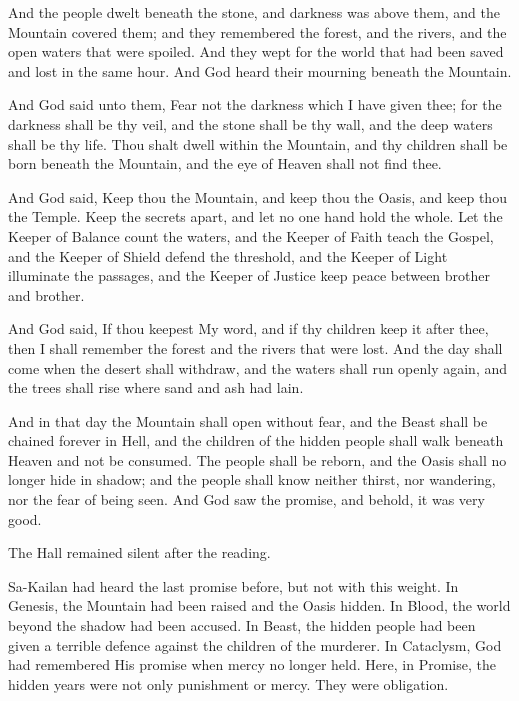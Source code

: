 \begin{scripture}
And the people dwelt beneath the stone, and darkness was above them, and the Mountain covered them; and they remembered the forest, and the rivers, and the open waters that were spoiled. And they wept for the world that had been saved and lost in the same hour. And God heard their mourning beneath the Mountain.

And God said unto them, Fear not the darkness which I have given thee; for the darkness shall be thy veil, and the stone shall be thy wall, and the deep waters shall be thy life. Thou shalt dwell within the Mountain, and thy children shall be born beneath the Mountain, and the eye of Heaven shall not find thee.

And God said, Keep thou the Mountain, and keep thou the Oasis, and keep thou the Temple. Keep the secrets apart, and let no one hand hold the whole. Let the Keeper of Balance count the waters, and the Keeper of Faith teach the Gospel, and the Keeper of Shield defend the threshold, and the Keeper of Light illuminate the passages, and the Keeper of Justice keep peace between brother and brother.

And God said, If thou keepest My word, and if thy children keep it after thee, then I shall remember the forest and the rivers that were lost. And the day shall come when the desert shall withdraw, and the waters shall run openly again, and the trees shall rise where sand and ash had lain.

And in that day the Mountain shall open without fear, and the Beast shall be chained forever in Hell, and the children of the hidden people shall walk beneath Heaven and not be consumed. The people shall be reborn, and the Oasis shall no longer hide in shadow; and the people shall know neither thirst, nor wandering, nor the fear of being seen. And God saw the promise, and behold, it was very good.
\end{scripture}

The Hall remained silent after the reading.\par

Sa-Kailan had heard the last promise before, but not with this weight. In Genesis, the Mountain had been raised and the Oasis hidden. In Blood, the world beyond the shadow had been accused. In Beast, the hidden people had been given a terrible defence against the children of the murderer. In Cataclysm, God had remembered His promise when mercy no longer held. Here, in Promise, the hidden years were not only punishment or mercy. They were obligation.\par

